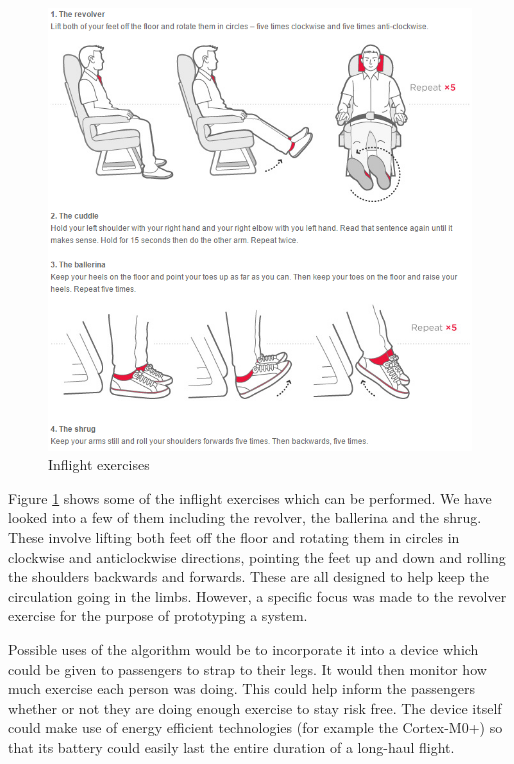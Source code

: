 \begin{figure}[h]
  \centering
    \includegraphics[width=1.0\textwidth]{figures/exercises}
  \caption{Inflight exercises \cite{virgin2015exercises}}
  \label{fig:exercises}
\end{figure}

Figure \ref{fig:exercises} shows some of the inflight exercises which can be performed. We have looked into a few of them including the revolver, the ballerina and the shrug. These involve lifting both feet off the floor and rotating them in circles in clockwise and anticlockwise directions, pointing the feet up and down and rolling the shoulders backwards and forwards. These are all designed to help keep the circulation going in the limbs. However, a specific focus was made to the revolver exercise for the purpose of prototyping a system.

Possible uses of the algorithm would be to incorporate it into a device which could be given to passengers to strap to their legs. It would then monitor how much exercise each person was doing. This could help inform the passengers whether or not they are doing enough exercise to stay risk free. The device itself could make use of energy efficient technologies (for example the Cortex-M0+) so that its battery could easily last the entire duration of a long-haul flight.

